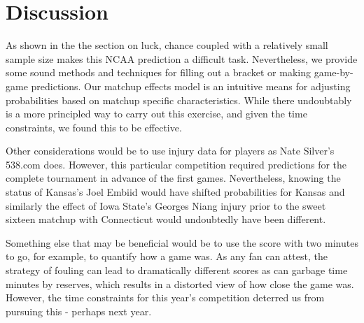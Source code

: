 \section{Discussion}
As shown in the the section on luck, chance coupled with a relatively small sample size makes this NCAA prediction a difficult task.  Nevertheless, we provide some sound methods and techniques for filling out a bracket or making game-by-game predictions.  Our matchup effects model is an intuitive means for adjusting probabilities based on matchup specific characteristics.  While there undoubtably is a more principled way to carry out this exercise, and given the time constraints, we found this to be effective.

Other considerations would be to use injury data for players as Nate Silver's 538.com does.  However, this particular competition required predictions for the complete tournament in advance of the first games.  Nevertheless, knowing the status of Kansas's Joel Embiid would have shifted probabilities for Kansas and similarly the effect of Iowa State's Georges Niang injury prior to the sweet sixteen matchup with Connecticut would undoubtedly have been different.

Something else that may be beneficial would be to use the score with two minutes to go, for example, to quantify how a game was.  As any fan can attest, the strategy of fouling can lead to dramatically different scores as can garbage time minutes by reserves, which results in a distorted view of how close the game was.  However, the time constraints for this year's competition deterred us from pursuing this - perhaps next year.

